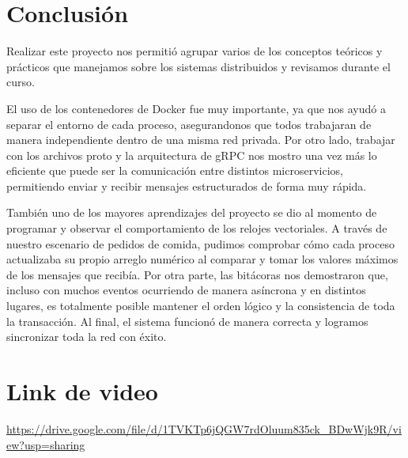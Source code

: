 \documentclass[letterpaper,11pt]{article}
\begin{document}
\newpage
\section{Conclusión}

Realizar este proyecto nos permitió agrupar varios de los conceptos teóricos y prácticos que manejamos sobre los sistemas distribuidos y revisamos durante el curso.

El uso de los contenedores de Docker fue muy importante, ya que nos ayudó a separar el entorno de cada proceso, asegurandonos que todos trabajaran de manera independiente dentro de una misma red privada. Por otro lado, trabajar con los archivos proto y la arquitectura de gRPC nos mostro una vez más lo eficiente que puede ser la comunicación entre distintos microservicios, permitiendo enviar y recibir mensajes estructurados de forma muy rápida.

También uno de los mayores aprendizajes del proyecto se dio al momento de programar y observar el comportamiento de los relojes vectoriales. A través de nuestro escenario de pedidos de comida, pudimos comprobar cómo cada proceso actualizaba su propio arreglo numérico al comparar y tomar los valores máximos de los mensajes que recibía. Por otra parte, las bitácoras nos demostraron que, incluso con muchos eventos ocurriendo de manera asíncrona y en distintos lugares, es totalmente posible mantener el orden lógico y la consistencia de toda la transacción. Al final, el sistema funcionó de manera correcta y logramos sincronizar toda la red con éxito.

\section{Link de video}

\url{https://drive.google.com/file/d/1TVKTp6jQGW7rdOluum835ck_BDwWjk9R/view?usp=sharing}



\nocite{*}
\printbibliography[heading=bibintoc, title={Referencias}]
\end{document}
